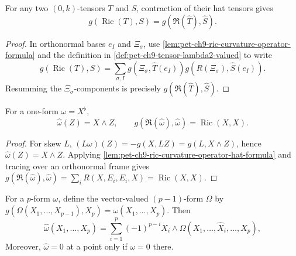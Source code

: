 \begin{lemma}
  \label{lem:pet-ch9-ric-curvature-operator-hat-formula}

  For any two $(0,k)$-tensors $T$ and $S$, contraction of their hat tensors
  gives
  \[
    g(\operatorname{Ric}(T),S)=g(\mathfrak R(\hat T),\hat S).
  \]
\end{lemma}
\begin{proof}
  \sketch
  In orthonormal bases \(e_I\) and \(\Xi_\sigma\), use
  \cref{lem:pet-ch9-ric-curvature-operator-formula} and the definition in
  \cref{def:pet-ch9-tensor-lambda2-valued} to write
  \[
    g(\operatorname{Ric}(T),S)
      =\sum_{\sigma,I}g(\Xi_\sigma,\hat T(e_I))
        g(R(\Xi_\sigma),\hat S(e_I)).
  \]
  Resumming the \(\Xi_\sigma\)-components is precisely
  \(g(\mathfrak R(\hat T),\hat S)\).
\end{proof}

\begin{proposition}
  \label{prop:pet-ch9-1form-hat-ricci}

  For a one-form $\omega=X^\flat$,
  \[
    \hat\omega(Z)=X\wedge Z,
    \qquad
    g(\mathfrak R(\hat\omega),\hat\omega)=\operatorname{Ric}(X,X).
  \]
\end{proposition}
\begin{proof}
  \sketch
  For skew \(L\),
  \((L\omega)(Z)=-g(X,LZ)=g(L,X\wedge Z)\), hence
  \(\hat\omega(Z)=X\wedge Z\).  Applying
  \cref{lem:pet-ch9-ric-curvature-operator-hat-formula} and tracing over an
  orthonormal frame gives
  \(g(\mathfrak R(\hat\omega),\hat\omega)=
    \sum_iR(X,E_i,E_i,X)=\operatorname{Ric}(X,X)\).
\end{proof}

\begin{remark}
  \label{rem:pet-ch9-pform-hat-formula}

  For a $p$-form $\omega$, define the vector-valued $(p-1)$-form $\Omega$ by
  \(g(\Omega(X_1,\dots,X_{p-1}),X_p)=\omega(X_1,\dots,X_p)\).  Then
  \[
    \hat\omega(X_1,\dots,X_p)=\sum_{i=1}^p(-1)^{p-i}X_i\wedge
    \Omega(X_1,\dots,\hat X_i,\dots,X_p),
  \]
  Moreover, $\hat\omega=0$ at a point only if $\omega=0$ there.
\end{remark}

